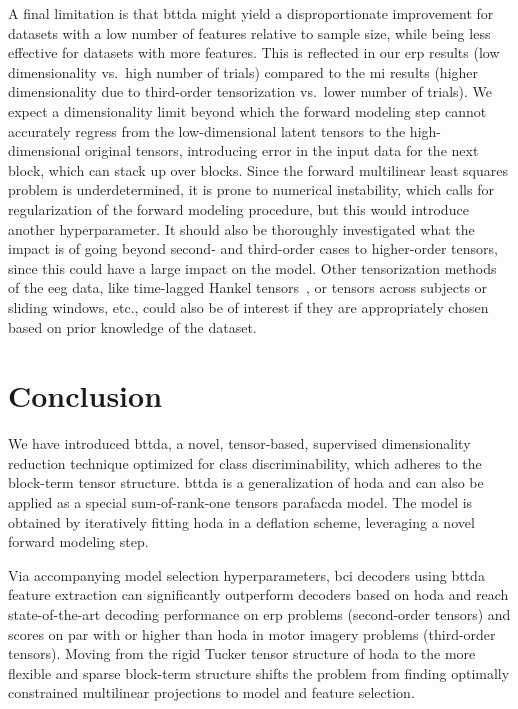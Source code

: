 \documentclass[twocolumn]{article}
\begin{document}
A final limitation is that \ac{bttda} might yield a disproportionate
improvement for datasets with a low number of features relative to sample size,
while being less effective for datasets with more features.
This is reflected in our \ac{erp} results (low dimensionality vs.\ high number of
trials) compared to the \ac{mi} results (higher dimensionality due to third-order
tensorization vs.\ lower number of trials).
We expect a dimensionality limit beyond which the forward modeling step cannot
accurately regress from the low-dimensional latent tensors to the high-
dimensional original tensors, introducing
error in the input data for the next block, which can stack up over blocks.
Since the forward multilinear least squares problem is underdetermined, it is
prone to numerical instability, which calls for regularization of the forward
modeling procedure, but this would introduce another hyperparameter.
It should also be thoroughly investigated what the impact is of going beyond
second- and third-order cases to higher-order tensors, since this could have a
large impact on the model.
Other tensorization methods of the \ac{eeg} data, like time-lagged Hankel
tensors~\cite{Papy2005}, or tensors across subjects or sliding windows, etc.,
could also be of interest if they are appropriately chosen based on prior
knowledge of the dataset.

\section{Conclusion}

We have introduced \acf{bttda}, a novel,
tensor-based, supervised dimensionality reduction technique optimized for class
discriminability, which adheres to the block-term tensor structure.
\ac{bttda} is a generalization of \acf{hoda} and can also be
applied as a special sum-of-rank-one tensors \ac{parafacda} model.
The model is obtained by iteratively fitting \ac{hoda} in a deflation scheme,
leveraging a novel forward modeling step.

Via accompanying model selection hyperparameters, \ac{bci} decoders using
\ac{bttda} feature extraction can significantly outperform decoders based on
\ac{hoda} and reach state-of-the-art decoding performance on \acl{erp} problems (second-order tensors) and scores on par with or higher than \ac{hoda} in motor imagery problems (third-order tensors).
Moving from the rigid Tucker tensor structure of \ac{hoda} to the more flexible
and sparse block-term structure shifts the problem from finding optimally constrained
multilinear projections to model and feature selection.
\end{document}
